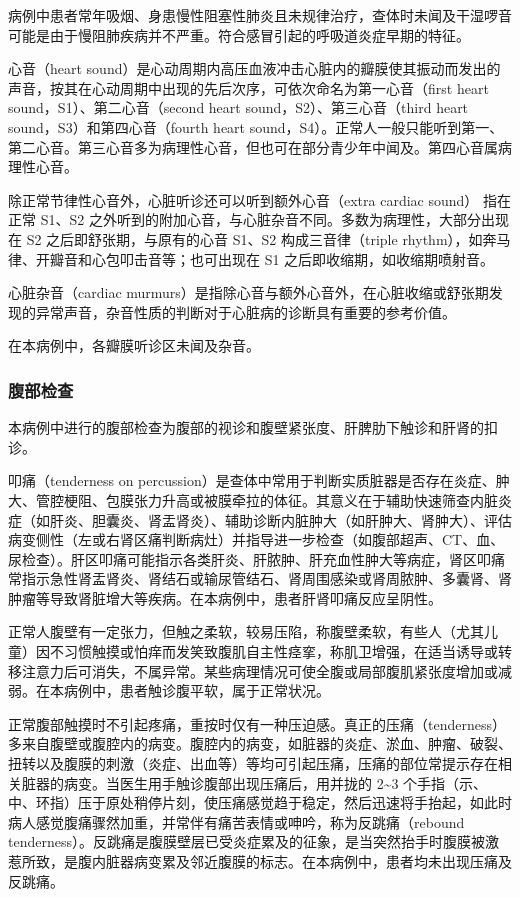 \documentclass[9pt,a4paper,twoside]{rho-class/rho}
\begin{document}
    病例中患者常年吸烟、身患慢性阻塞性肺炎且未规律治疗，查体时未闻及干湿啰音可能是由于慢阻肺疾病并不严重。符合感冒引起的呼吸道炎症早期的特征。

    心音（heart sound）是心动周期内高压血液冲击心脏内的瓣膜使其振动而发出的声音，按其在心动周期中出现的先后次序，可依次命名为第一心音（first heart sound，S1）、第二心音（second heart sound，S2）、第三心音（third heart sound，S3）和第四心音（fourth heart sound，S4）。正常人一般只能听到第一、第二心音。第三心音多为病理性心音，但也可在部分青少年中闻及。第四心音属病理性心音。

    除正常节律性心音外，心脏听诊还可以听到额外心音（extra cardiac sound） 指在正常 S1、S2 之外听到的附加心音，与心脏杂音不同。多数为病理性，大部分出现在 S2 之后即舒张期，与原有的心音 S1、S2 构成三音律（triple rhythm），如奔马律、开瓣音和心包叩击音等；也可出现在 S1 之后即收缩期，如收缩期喷射音。

    心脏杂音（cardiac murmurs）是指除心音与额外心音外，在心脏收缩或舒张期发现的异常声音，杂音性质的判断对于心脏病的诊断具有重要的参考价值。

    在本病例中，各瓣膜听诊区未闻及杂音。

    \subsubsection{腹部检查}

    本病例中进行的腹部检查为腹部的视诊和腹壁紧张度、肝脾肋下触诊和肝肾的扣诊。

    叩痛（tenderness on percussion）是查体中常用于判断实质脏器是否存在炎症、肿大、管腔梗阻、包膜张力升高或被膜牵拉的体征。其意义在于辅助快速筛查内脏炎症（如肝炎、胆囊炎、肾盂肾炎）、辅助诊断内脏肿大（如肝肿大、肾肿大）、评估病变侧性（左或右肾区痛判断病灶）并指导进一步检查（如腹部超声、CT、血、尿检查）。肝区叩痛可能指示各类肝炎、肝脓肿、肝充血性肿大等病症，肾区叩痛常指示急性肾盂肾炎、肾结石或输尿管结石、肾周围感染或肾周脓肿、多囊肾、肾肿瘤等导致肾脏增大等疾病。在本病例中，患者肝肾叩痛反应呈阴性。

    正常人腹壁有一定张力，但触之柔软，较易压陷，称腹壁柔软，有些人（尤其儿童）因不习惯触摸或怕痒而发笑致腹肌自主性痉挛，称肌卫增强，在适当诱导或转移注意力后可消失，不属异常。某些病理情况可使全腹或局部腹肌紧张度增加或减弱。在本病例中，患者触诊腹平软，属于正常状况。

    正常腹部触摸时不引起疼痛，重按时仅有一种压迫感。真正的压痛（tenderness）多来自腹壁或腹腔内的病变。腹腔内的病变，如脏器的炎症、淤血、肿瘤、破裂、扭转以及腹膜的刺激（炎症、出血等）等均可引起压痛，压痛的部位常提示存在相关脏器的病变。当医生用手触诊腹部出现压痛后，用并拢的 2\textasciitilde3 个手指（示、中、环指）压于原处稍停片刻，使压痛感觉趋于稳定，然后迅速将手抬起，如此时病人感觉腹痛骤然加重，并常伴有痛苦表情或呻吟，称为反跳痛（rebound tenderness）。反跳痛是腹膜壁层已受炎症累及的征象，是当突然抬手时腹膜被激惹所致，是腹内脏器病变累及邻近腹膜的标志。在本病例中，患者均未出现压痛及反跳痛。
\end{document}
